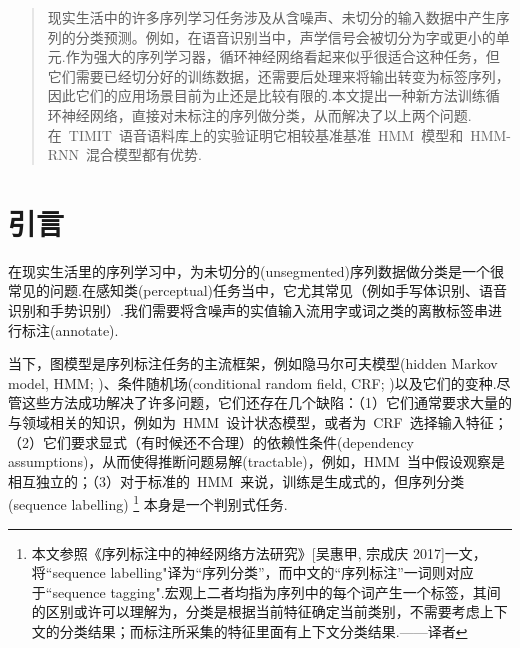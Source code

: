 \documentclass{ctexart}
\begin{document}
 


\begin{abstract} 
现实生活中的许多序列学习任务涉及从含噪声、未切分的输入数据中产生序列的分类预测。例如，在语音识别当中，声学信号会被切分为字或更小的单元.作为强大的序列学习器，循环神经网络看起来似乎很适合这种任务，但它们需要已经切分好的训练数据，还需要后处理来将输出转变为标签序列，因此它们的应用场景目前为止还是比较有限的.本文提出一种新方法训练循环神经网络，直接对未标注的序列做分类，从而解决了以上两个问题.在~TIMIT~语音语料库上的实验证明它相较基准基准~HMM~模型和~HMM-RNN~混合模型都有优势.
\end{abstract} 

\section{引言}
\label{sec:intro}
在现实生活里的序列学习中，为未切分的(unsegmented)序列数据做分类是一个很常见的问题.在感知类(perceptual)任务当中，它尤其常见（例如手写体识别、语音识别和手势识别）.我们需要将含噪声的实值输入流用字或词之类的离散标签串进行标注(annotate).

当下，图模型是序列标注任务的主流框架，例如隐马尔可夫模型(hidden Markov model, HMM; \citealp{rabiner1989tutorial})、条件随机场(conditional random field, CRF; \citealp{lafferty2001conditional})以及它们的变种.尽管这些方法成功解决了许多问题，它们还存在几个缺陷：（1）它们通常要求大量的与领域相关的知识，例如为~HMM~设计状态模型，或者为~CRF~选择输入特征；（2）它们要求显式（有时候还不合理）的依赖性条件(dependency assumptions)，从而使得推断问题易解(tractable)，例如，HMM~当中假设观察是相互独立的；（3）对于标准的~HMM~来说，训练是生成式的，但序列分类(sequence labelling)
\footnote{本文参照《序列标注中的神经网络方法研究》[吴惠甲, 宗成庆 2017]一文，将``sequence labelling"译为“序列分类”，而中文的“序列标注”一词则对应于``sequence tagging".宏观上二者均指为序列中的每个词产生一个标签，其间的区别或许可以理解为，分类是根据当前特征确定当前类别，不需要考虑上下文的分类结果；而标注所采集的特征里面有上下文分类结果.——译者}
本身是一个判别式任务.
\end{document}

